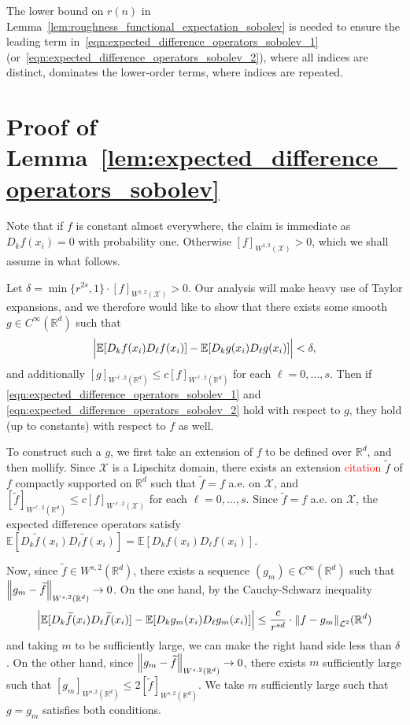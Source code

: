 \documentclass{article}
\newcommand{\Reals}{\mathbb{R}}
\newcommand{\1}{\mathbf{1}}
\newcommand{\Rd}{\Reals^d}
\newcommand{\Xset}{\mathcal{X}}
\newcommand{\Leb}{\mathcal{L}}
\newcommand{\Ebb}{\mathbb{E}}
\newcommand{\wt}[1]{\widetilde{#1}}
\theoremstyle{alden}
\theoremstyle{aldenthm}
\theoremstyle{definition}
\theoremstyle{remark}
\begin{document}
The lower bound on $r(n)$ in Lemma~\ref{lem:roughness_functional_expectation_sobolev} is needed to ensure the leading term in~\eqref{eqn:expected_difference_operators_sobolev_1} (or~\eqref{eqn:expected_difference_operators_sobolev_2}), where all indices are distinct, dominates the lower-order terms, where indices are repeated.

\section{Proof of Lemma~\ref{lem:expected_difference_operators_sobolev}}

Note that if $f$ is constant almost everywhere, the claim is immediate as $D_kf(x_i) = 0$ with probability one. Otherwise $[f]_{W^{1,2}(\Xset)} > 0$, which we shall assume in what follows.

Let $\delta = \min\{r^{2s},1\}\cdot[f]_{W^{1,2}(\Xset)} > 0$. Our analysis will make heavy use of Taylor expansions, and we therefore would like to show that there exists some smooth $g \in C^{\infty}(\Rd)$ such that 
\begin{equation*}
\Bigl|\Ebb[D_kf(x_i) D_{\ell} f(x_i)] - \Ebb[D_kg(x_i) D_\ell g(x_i)]\Bigr| <  \delta,
\end{equation*}
and additionally $[g]_{W^{\ell,2}(\Rd)} \leq c [f]_{W^{\ell,2}(\Rd)}$ for each $\ell = 0,\ldots,s$.  Then if \eqref{eqn:expected_difference_operators_sobolev_1} and \eqref{eqn:expected_difference_operators_sobolev_2} hold with respect to $g$, they hold (up to constants) with respect to $f$ as well. 

To construct such a $g$, we first take an extension of $f$ to be defined over $\Rd$, and then mollify. Since $\Xset$ is a Lipschitz domain, there exists an extension \textcolor{red}{citation} $\wt{f}$ of $f$ compactly supported on $\Rd$ such that $\wt{f} = f$ a.e. on $\Xset$, and $[\wt{f}]_{W^{\ell,2}(\Rd)} \leq c [f]_{W^{\ell,2}(\Xset)}$ for each $\ell = 0,\ldots,s$. Since $\wt{f} = f$ a.e. on $\Xset$, the expected difference operators satisfy $\Ebb[D_k\wt{f}(x_i) D_\ell \wt{f}(x_i)] = \Ebb[D_kf(x_i) D_\ell f(x_i)]$. 

Now, since $\wt{f} \in W^{s,2}(\Rd)$, there exists a sequence $(g_m) \in C^{\infty}(\Rd)$ such that $\norm{g_m - \wt{f}}_{W^{s,2}(\Rd)} \to 0$. On the one hand, by the Cauchy-Schwarz inequality
\begin{equation*}
\abs{\Ebb[D_k\wt{f}(x_i) D_{\ell} \wt{f}(x_i)] - \Ebb[D_kg_m(x_i) D_\ell g_m(x_i)]} \leq \frac{c}{r^{sd}} \cdot \norm{f - g_m}_{\Leb^2}(\Rd) 
\end{equation*}
and taking $m$ to be sufficiently large, we can make the right hand side less than $\delta$. On the other hand, since $\norm{g_m - \wt{f}}_{W^{s,2}(\Rd)} \to 0$, there exists $m$ sufficiently large such that $[g_m]_{W^{s,2}(\Rd)} \leq 2 [\wt{f}]_{W^{s,2}(\Rd)}$. We take $m$ sufficiently large such that $g = g_m$ satisfies both conditions. 
\end{document}
